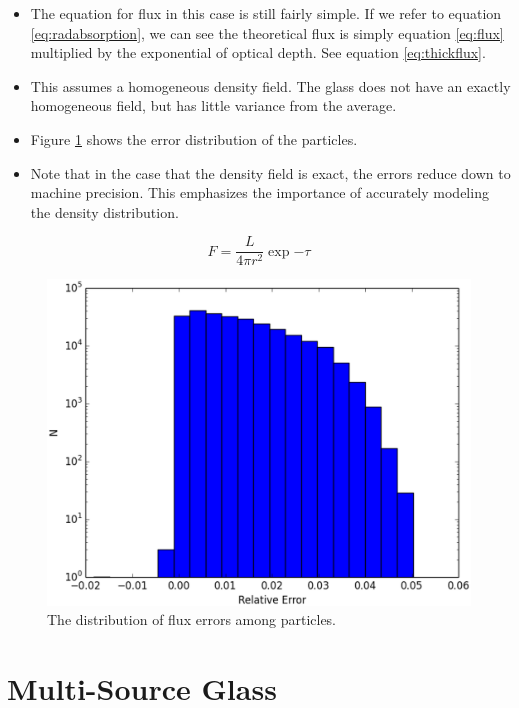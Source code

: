 \begin{itemize}
\item The equation for flux in this case is still fairly simple. If we refer to equation \ref{eq:radabsorption}, we can see the theoretical flux is simply equation \ref{eq:flux} multiplied by the exponential of optical depth. See equation \ref{eq:thickflux}.
\item This assumes a homogeneous density field. The glass does not have an exactly homogeneous field, but has little variance from the average.
\item Figure \ref{fig:thickglasserrors} shows the error distribution of the particles.
\item Note that in the case that the density field is exact, the errors reduce down to machine precision. This emphasizes the importance of accurately modeling the density distribution.
\end{itemize}

\begin{equation}
\label{eq:thickflux}
F = \frac{L}{4\pi r^2} \exp{-\tau}
\end{equation}

\begin{figure}
\includegraphics[width=\textwidth]{graphics/error.eps}
\caption[Error distribution for a single source in a uniform field.]{The distribution of flux errors among particles.}
\label{fig:thickglasserrors}
\end{figure}

\section{Multi-Source Glass}
\label{sec:multiglass}

